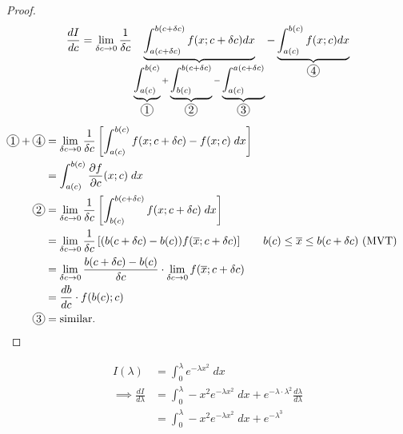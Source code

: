\documentclass{../../template/note}
\begin{document}
    \begin{proof}
        \begin{align*}
        \frac{dI}{dc} &= \lim_{\delta c \to 0} \frac{1}{\delta c} \underbrace{\int_{a(c+\delta c)}^{b(c + \delta c)} f(x; c + \delta c) dx}_{\underbrace{\int_{a(c)}^{b(c)}}_{\circled 1} + \underbrace{\int_{b(c)}^{b(c + \delta c)}}_{\circled 2} - \underbrace{\int_{a(c)}^{a(c + \delta c)}}_{\circled 3}} - \underbrace{\int_{a(c)}^{b(c)} f(x; c) dx}_{\circled 4} \\
        \end{align*}
        \begin{align*}
            \circled 1 + \circled 4 &= \lim_{\delta c \to 0} \frac{1}{\delta c} \left[\int_{a(c)}^{b(c)} f(x; c + \delta c) - f(x; c) \; dx \right] \\
            &= \int_{a(c)}^{b(c)} \frac{\partial f}{\partial c}(x; c) \; dx \\
            \circled 2 &= \lim_{\delta c \to 0} \frac{1}{\delta c} \left[\int_{b(c)}^{b(c + \delta c)} f(x; c + \delta c) \; dx\right] \\
            &= \lim_{\delta c \to 0} \frac{1}{\delta c} \left[(b(c + \delta c) - b(c)) f(\overline{x}; c + \delta c)\right] && b(c) \leq \overline{x} \leq b(c + \delta c) \text{ (MVT)} \\
            &= \lim_{\delta c \to 0} \frac{b(c + \delta c) - b(c)}{\delta c} \cdot \lim_{\delta c \to 0} f(\overline{x}; c + \delta c) \\
            &= \frac{db}{dc} \cdot f(b(c); c) \\
            \circled 3 &= \text{similar.}
        \end{align*}
        
        
    \end{proof}

    \begin{example}
        \begin{align*}
            I(\lambda) &= \int_0^\lambda e^{-\lambda x^2} \; dx \\
            \implies \frac{dI}{d \lambda} &= \int_0^\lambda -x^2 e^{-\lambda x^2} \; dx + e^{-\lambda \cdot \lambda^2} \frac{d \lambda}{d \lambda} \\
            &= \int_0^\lambda -x^2 e^{-\lambda x^2} \; dx + e^{-\lambda^3}
        \end{align*}
    \end{example}
    
    
    
\end{document}
